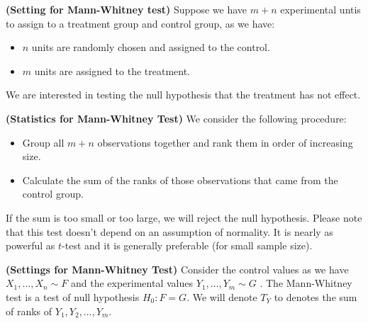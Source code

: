 \begin{remark}{\textbf{(Setting for Mann-Whitney test)}}
    Suppose we have $m + n$ experimental untis to assign to a treatment group and control group, as we have:
    \begin{itemize}
        \item $n$ units are randomly chosen and assigned to the control. 
        \item $m$ units are assigned to the treatment. 
    \end{itemize}
    We are interested in testing the null hypothesis that the treatment has not effect. 
\end{remark}

\begin{definition}{\textbf{(Statistics for Mann-Whitney Test)}}
    We consider the following procedure:
    \begin{itemize}
        \item Group all $m+n$ observations together and rank them in order of increasing size. 
        \item Calculate the sum of the ranks of those observations that came from the control group. 
    \end{itemize}
    If the sum is too small or too large, we will reject the null hypothesis. Please note that this test doesn't depend on an assumption of normality. It is nearly as powerful as $t$-test and it is generally preferable (for small sample size). 
\end{definition}

\begin{remark}{\textbf{(Settings for Mann-Whitney Test)}}
    Consider the control values as we have $X_1,\dots,X_n \sim F$ and the experimental values $Y_1,\dots,Y_m \sim G$ . The Mann-Whitney test is a test of null hypothesis $H_0 : F = G$. We will denote $T_Y$ to denotes the sum of ranks of $Y_1,Y_2,\dots,Y_m$.
\end{remark}

